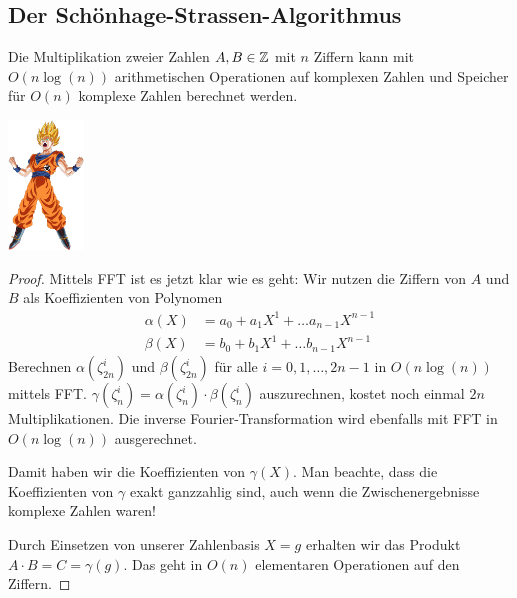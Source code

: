 
\begin{minipage}[l]{12cm}
    \subsection{Der Schönhage-Strassen-Algorithmus}\label{schoenhage-strassen}
    \begin{corollary}
        Die Multiplikation zweier Zahlen $A,B\in\mathbb{Z}$ mit $n$ Ziffern kann mit $O(n\log(n))$ arithmetischen Operationen auf komplexen Zahlen und Speicher für $O(n)$ komplexe Zahlen berechnet werden.
    \end{corollary}
\end{minipage}\hfill
\begin{minipage}{2cm}
    \setlength{\baselineskip}{7pt}
    \includegraphics[width=2cm]{levelup_goku}
\end{minipage}
\begin{proof}
    Mittels FFT ist es jetzt klar wie es geht: Wir nutzen die Ziffern von $A$ und $B$ als Koeffizienten von Polynomen
    \begin{align*}
        \alpha(X) &= a_0 + a_1 X^1 + \ldots a_{n-1} X^{n-1}\\
        \beta(X)  &= b_0 + b_1 X^1 + \ldots b_{n-1} X^{n-1}
    \end{align*}
    Berechnen $\alpha(\zeta_{2n}^i)$ und $\beta(\zeta_{2n}^i)$ für alle $i=0,1,\ldots,2n-1$ in $O(n\log(n))$ mittels FFT. $\gamma(\zeta_n^i) = \alpha(\zeta_n^i)\cdot\beta(\zeta_n^i)$ auszurechnen, kostet noch einmal $2n$ Multiplikationen. Die inverse Fourier-Transformation wird ebenfalls mit FFT in $O(n\log(n))$ ausgerechnet.

    Damit haben wir die Koeffizienten von $\gamma(X)$. Man beachte, dass die Koeffizienten von $\gamma$ exakt ganzzahlig sind, auch wenn die Zwischenergebnisse komplexe Zahlen waren!

    Durch Einsetzen von unserer Zahlenbasis $X=g$ erhalten wir das Produkt $A\cdot B = C=\gamma(g)$. Das geht in $O(n)$ elementaren Operationen auf den Ziffern.
\end{proof}

